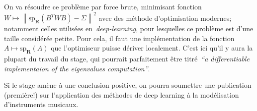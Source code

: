 \documentclass[a4paper,11pt]{article}
\begin{document}
On va résoudre ce problème par force brute, minimisant
fonction~$W\mapsto\left\|\mathrm{sp}_\mathbf{R}\left(B^TWB\right)-\Sigma\right\|^2$
avec des méthode d'optimisation modernes; notamment celles utilisées
en~\emph{deep-learning}, pour lesquelles ce problème est d'une taille
considérée petite.  Pour cela, il faut une implémentation de la
fonction~$A\mapsto\mathrm{sp}_\mathbf R(A)$ que l'optimiseur puisse dériver
localement.  C'est ici qu'il y aura la plupart du travail du stage, qui
pourrait parfaitement être titré~\emph{``a differentiable implementaion of the
eigenvalues computation''}.

Si le stage amène à une conclusion positive, on pourra soumettre une
publication (première!) sur l'application des méthodes de deep learning à la
modélisation d'instruments musicaux.




%
\end{document}
